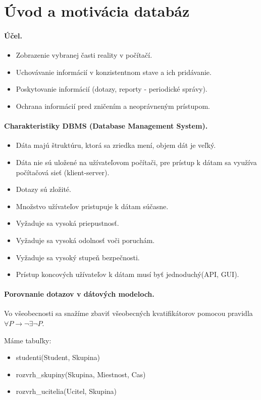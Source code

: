 \documentclass[10pt,a4paper]{article}
\begin{document}
\section*{Úvod a motivácia databáz}
\paragraph{Účel.}
\begin{itemize}
\item Zobrazenie vybranej časti reality v počítačí.
\item Uchovávanie informácií v konzistentnom stave a ich pridávanie.
\item Poskytovanie informácií (dotazy, reporty - periodické správy). 
\item Ochrana informácií pred zničením a neoprávneným prístupom. 
\end{itemize}

\paragraph{Charakteristiky DBMS (Database Management System).}
\begin{itemize}
\item Dáta majú štruktúru, ktorá sa zriedka mení, objem dát je veľký.
\item Dáta nie sú uložené na užívateľovom počítači, pre prístup k dátam sa využíva počítačová sieť (klient-server).
\item Dotazy sú zložité.
\item Množstvo užívateľov pristupuje k dátam súčasne.
\item Vyžaduje sa vysoká priepustnosť.
\item Vyžaduje sa vysoká odolnosť voči poruchám.
\item Vyžaduje sa vysoký stupeň bezpečnosti.
\item Prístup koncových užívateľov k dátam musí byť jednoduchý(API, GUI).
\end{itemize}

\paragraph{Porovnanie dotazov v dátových modeloch.}
Vo všeobecnosti sa snažíme zbaviť všeobecných kvatifikátorov pomocou pravidla $\forall P \rightarrow \neg \exists \neg P$.

Máme tabuľky: 
\begin{itemize}
\item studenti(Student, Skupina)
\item rozvrh\_skupiny(Skupina, Miestnost, Cas)
\item rozvrh\_ucitelia(Ucitel, Skupina)
\end{itemize}
\end{document}
